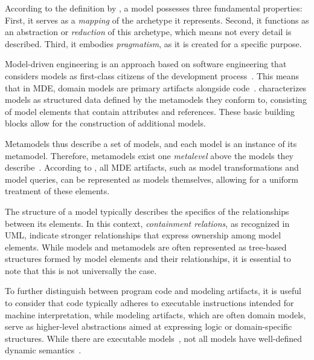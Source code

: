According to the definition by \citet{Stachowiak1973}, a model possesses three fundamental properties: First, it serves as a \textit{mapping} of the archetype it represents. Second, it functions as an abstraction or \textit{reduction} of this archetype, which means not every detail is described. Third, it embodies \textit{pragmatism}, as it is created for a specific purpose.

Model-driven engineering is an approach based on software engineering that considers models as first-class citizens of the development process~\cite{Brambilla2017}. This means that in \ac{MDE}, domain models are primary artifacts alongside code~\cite{Kent2002}.
\cite{Martinez2020} characterizes models as structured data defined by the metamodels they conform to, consisting of model elements that contain attributes and references. These basic building blocks allow for the construction of additional models. 

Metamodels thus describe a set of models, and each model is an instance of its metamodel. Therefore, metamodels exist one \textit{metalevel} above the models they describe~\cite{Stahl2006}.
According to \cite{Bezevin2005}, all \ac{MDE} artifacts, such as model transformations and model queries, can be represented as models themselves, allowing for a uniform treatment of these elements.

The structure of a model typically describes the specifics of the relationships between its elements. In this context, \textit{containment relations}, as recognized in \ac{UML}, indicate stronger relationships that express ownership among model elements.
While models and metamodels are often represented as tree-based structures formed by model elements and their relationships, it is essential to note that this is not universally the case.

To further distinguish between program code and modeling artifacts, it is useful to consider that code typically adheres to executable instructions intended for machine interpretation, while modeling artifacts, which are often domain models, serve as higher-level abstractions aimed at expressing logic or domain-specific structures. While there are executable models~\cite{Seidewitz2014, Fuksa2024}, not all models have well-defined dynamic semantics~\cite{Stahl2006}.

